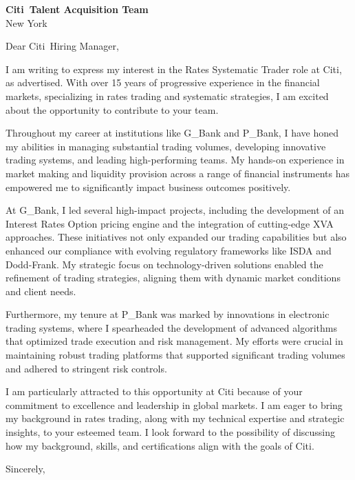 \documentclass{letter}
\newcommand{\company}{Citi}
\begin{document}
\begin{letter}{\textbf{\company\ Talent Acquisition Team} \\                
                New York }

\opening{Dear \company\ Hiring Manager,}

I am writing to express my interest in the Rates Systematic Trader role at Citi, as advertised. With over 15 years of progressive experience in the financial markets, specializing in rates trading and systematic strategies, I am excited about the opportunity to contribute to your team.

Throughout my career at institutions like G_Bank and P_Bank, I have honed my abilities in managing substantial trading volumes, developing innovative trading systems, and leading high-performing teams. My hands-on experience in market making and liquidity provision across a range of financial instruments has empowered me to significantly impact business outcomes positively.

At G_Bank, I led several high-impact projects, including the development of an Interest Rates Option pricing engine and the integration of cutting-edge XVA approaches. These initiatives not only expanded our trading capabilities but also enhanced our compliance with evolving regulatory frameworks like ISDA and Dodd-Frank. My strategic focus on technology-driven solutions enabled the refinement of trading strategies, aligning them with dynamic market conditions and client needs.

Furthermore, my tenure at P_Bank was marked by innovations in electronic trading systems, where I spearheaded the development of advanced algorithms that optimized trade execution and risk management. My efforts were crucial in maintaining robust trading platforms that supported significant trading volumes and adhered to stringent risk controls.

I am particularly attracted to this opportunity at Citi because of your commitment to excellence and leadership in global markets. I am eager to bring my background in rates trading, along with my technical expertise and strategic insights, to your esteemed team. I look forward to the possibility of discussing how my background, skills, and certifications align with the goals of Citi.



\closing{Sincerely,}

\end{letter}
\end{document}
